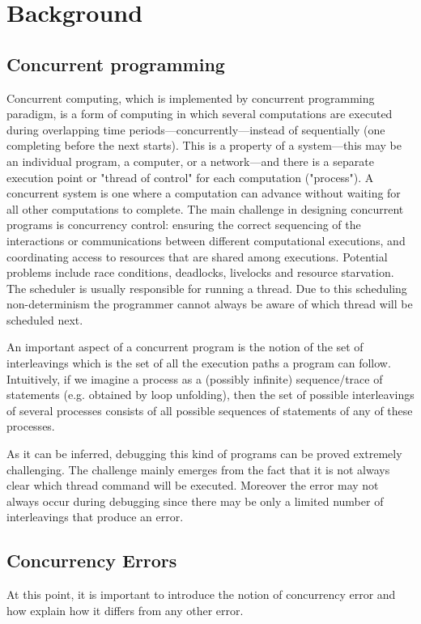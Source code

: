 \chapter{Background}
\label{Chapter 2}

\section{Concurrent programming}

Concurrent computing, which is implemented by concurrent programming paradigm, is a form of computing in which several 
computations are executed during overlapping time 
periods—concurrently—instead of sequentially (one completing before the next starts). 
This is a property of a system—this may be an individual program, a computer, or a network—and there is a separate execution point 
or "thread of control" for each computation ("process"). A concurrent system is one where a computation can advance without waiting for 
all other computations to complete.
The main challenge in designing concurrent programs is concurrency control: ensuring the correct sequencing of the 
interactions or communications between different computational executions, and coordinating access to resources that are shared among executions.
Potential problems include race conditions, deadlocks, livelocks and resource starvation. 
The scheduler is usually responsible for running a thread. Due to this scheduling non-determinism the programmer cannot always be aware of which thread
will be scheduled next.

An important aspect of a concurrent program is the notion of the set of interleavings which is the set of all the execution paths a program can follow.
Intuitively, if we imagine a process as a (possibly infinite) sequence/trace of statements (e.g. obtained by loop unfolding),
then the set of possible interleavings of several processes consists of all possible sequences of statements of any of these processes.

As it can be inferred, debugging this kind of programs can be proved extremely challenging. The challenge mainly emerges from the fact that it is 
not always clear which thread command will be executed. Moreover the error may not always occur during debugging since there may be only a limited
number of interleavings that produce an error. 

\section{Concurrency Errors}
At this point, it is important to introduce the notion of concurrency error and how explain how it differs from any other error.

